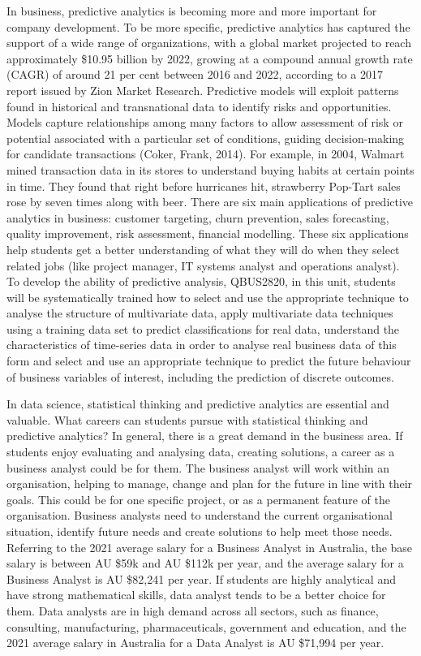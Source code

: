 \documentclass[12pt]{article}
\begin{document}
In business, predictive analytics is becoming more and more important for company development. To be more specific, predictive analytics has captured the support of a wide range of organizations, with a global market projected to reach approximately \$10.95 billion by 2022, growing at a compound annual growth rate (CAGR) of around 21 per cent between 2016 and 2022, according to a 2017 report issued by Zion Market Research. Predictive models will exploit patterns found in historical and transnational data to identify risks and opportunities. Models capture relationships among many factors to allow assessment of risk or potential associated with a particular set of conditions, guiding decision-making for candidate transactions (Coker, Frank, 2014). For example, in 2004, Walmart mined transaction data in its stores to understand buying habits at certain points in time. They found that right before hurricanes hit, strawberry Pop-Tart sales rose by seven times along with beer. There are six main applications of predictive analytics in business: customer targeting, churn prevention, sales forecasting, quality improvement, risk assessment, financial modelling. These six applications help students get a better understanding of what they will do when they select related jobs (like project manager, IT systems analyst and operations analyst). To develop the ability of predictive analysis, QBUS2820, in this unit, students will be systematically trained how to select and use the appropriate technique to analyse the structure of multivariate data, apply multivariate data techniques using a training data set to predict classifications for real data, understand the characteristics of time-series data in order to analyse real business data of this form and select and use an appropriate technique to predict the future behaviour of business variables of interest, including the prediction of discrete outcomes.

In data science, statistical thinking and predictive analytics are essential and valuable. What careers can students pursue with statistical thinking and predictive analytics? In general, there is a great demand in the business area. If students enjoy evaluating and analysing data, creating solutions, a career as a business analyst could be for them. The business analyst will work within an organisation, helping to manage, change and plan for the future in line with their goals. This could be for one specific project, or as a permanent feature of the organisation. Business analysts need to understand the current organisational situation, identify future needs and create solutions to help meet those needs. Referring to the 2021 average salary for a Business Analyst in Australia, the base salary is between AU \$59k and AU \$112k per year, and the average salary for a Business Analyst is AU \$82,241 per year. If students are highly analytical and have strong mathematical skills, data analyst tends to be a better choice for them. Data analysts are in high demand across all sectors, such as finance, consulting, manufacturing, pharmaceuticals, government and education, and the 2021 average salary in Australia for a Data Analyst is AU \$71,994 per year.
\end{document}
